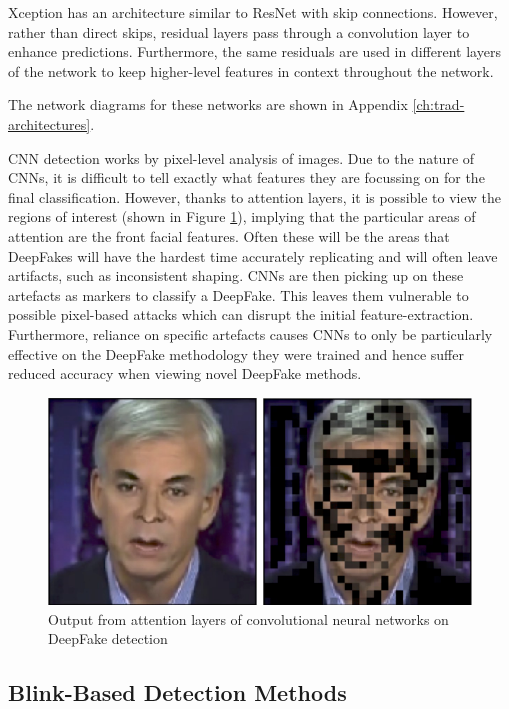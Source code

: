 Xception has an architecture similar to ResNet with skip connections. However, rather than direct skips, residual layers pass through a convolution layer to enhance predictions. Furthermore, the same residuals are used in different layers of the network to keep higher-level features in context throughout the network.

The network diagrams for these networks are shown in Appendix \ref{ch:trad-architectures}.

CNN detection works by pixel-level analysis of images. Due to the nature of CNNs, it is difficult to tell exactly what features they are focussing on for the final classification. However, thanks to attention layers, it is possible to view the regions of interest (shown in Figure \ref{fig:attention}), implying that the particular areas of attention are the front facial features. Often these will be the areas that DeepFakes will have the hardest time accurately replicating and will often leave artifacts, such as inconsistent shaping\cite{verdoliva2020media}. CNNs are then picking up on these artefacts as markers to classify a DeepFake. This leaves them vulnerable to possible pixel-based attacks which can disrupt the initial feature-extraction\cite{gandhi2020adversarial}. Furthermore, reliance on specific artefacts causes CNNs to only be particularly effective on the DeepFake methodology they were trained and hence suffer reduced accuracy when viewing novel DeepFake methods\cite{thing2023deepfake}.

\begin{figure}[H]
    \centering
    \includegraphics[width=0.5\linewidth]{dissertation//figures/attention-cnns.png}
    \caption{Output from attention layers of convolutional neural networks on DeepFake detection\cite{bonettini2021video}}
    \label{fig:attention}
\end{figure}

\subsection{Blink-Based Detection Methods}
\label{sec:blink-based-detection}



